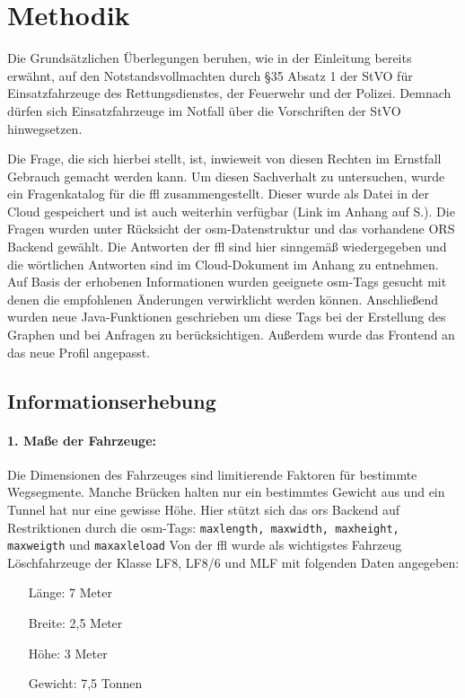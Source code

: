 \section{Methodik}
Die Grundsätzlichen Überlegungen beruhen, wie in der Einleitung bereits erwähnt, auf den Notstandsvollmachten durch §35 Absatz 1 der StVO für Einsatzfahrzeuge des Rettungsdienstes, der Feuerwehr und der Polizei.
Demnach dürfen sich Einsatzfahrzeuge im Notfall über die Vorschriften der StVO hinwegsetzen.

Die Frage, die sich hierbei stellt, ist, inwieweit von diesen Rechten im Ernstfall Gebrauch gemacht werden kann.
Um diesen Sachverhalt zu untersuchen, wurde ein Fragenkatalog für die \gls{ffl} zusammengestellt.
Dieser wurde als Datei in der Cloud gespeichert und ist auch weiterhin verfügbar (Link im Anhang auf S.\pageref{sec:anhang}).
Die Fragen wurden unter Rücksicht der \gls{osm}-Datenstruktur und das vorhandene ORS Backend gewählt.
Die Antworten der \gls{ffl} sind hier sinngemäß wiedergegeben und die wörtlichen Antworten sind im Cloud-Dokument im Anhang zu entnehmen.
Auf Basis der erhobenen Informationen wurden geeignete \gls{osm}-Tags gesucht mit denen die empfohlenen Änderungen verwirklicht werden können.
Anschließend wurden neue Java-Funktionen geschrieben um diese Tags bei der Erstellung des Graphen und bei Anfragen zu berücksichtigen.
Außerdem wurde das Frontend an das neue Profil angepasst.

\subsection{Informationserhebung}

\paragraph*{1. Maße der Fahrzeuge:}
\label{frage1}
\par
Die Dimensionen des Fahrzeuges sind limitierende Faktoren für bestimmte Wegsegmente.
Manche Brücken halten nur ein bestimmtes Gewicht aus und ein Tunnel hat nur eine gewisse Höhe.
Hier stützt sich das \gls{ors} Backend auf Restriktionen durch die \gls{osm}-Tags: \texttt{maxlength, maxwidth, maxheight, maxweigth} und \texttt{maxaxleload} Von der \gls{ffl} wurde als wichtigstes Fahrzeug Löschfahrzeuge der Klasse LF8, LF8/6 und MLF mit folgenden Daten angegeben:
\begin{itemize}
\centering
\item[Länge:] 7 Meter
\item[Breite:] 2,5 Meter
\item[Höhe:] 3 Meter
\item[Gewicht:] 7,5 Tonnen
\end{itemize}

